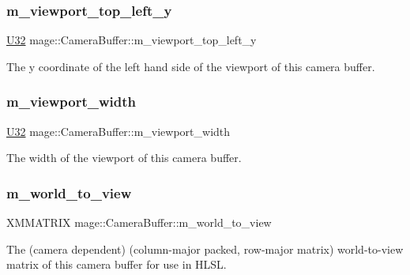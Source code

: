 \subsubsection{\texorpdfstring{m\+\_\+viewport\+\_\+top\+\_\+left\+\_\+y}{m\_viewport\_top\_left\_y}}
{\footnotesize\ttfamily \hyperlink{namespacemage_a41c104c036fba3756a74e19f793eeaa1}{U32} mage\+::\+Camera\+Buffer\+::m\+\_\+viewport\+\_\+top\+\_\+left\+\_\+y}

The y coordinate of the left hand side of the viewport of this camera buffer. \hypertarget{structmage_1_1_camera_buffer_a9aec8f6ee54281ae7ec410be846c3658}{}\label{structmage_1_1_camera_buffer_a9aec8f6ee54281ae7ec410be846c3658} 
\subsubsection{\texorpdfstring{m\+\_\+viewport\+\_\+width}{m\_viewport\_width}}
{\footnotesize\ttfamily \hyperlink{namespacemage_a41c104c036fba3756a74e19f793eeaa1}{U32} mage\+::\+Camera\+Buffer\+::m\+\_\+viewport\+\_\+width}

The width of the viewport of this camera buffer. \hypertarget{structmage_1_1_camera_buffer_a28db697d7da502479b3e29752122c9f4}{}\label{structmage_1_1_camera_buffer_a28db697d7da502479b3e29752122c9f4} 
\subsubsection{\texorpdfstring{m\+\_\+world\+\_\+to\+\_\+view}{m\_world\_to\_view}}
{\footnotesize\ttfamily X\+M\+M\+A\+T\+R\+IX mage\+::\+Camera\+Buffer\+::m\+\_\+world\+\_\+to\+\_\+view}

The (camera dependent) (column-\/major packed, row-\/major matrix) world-\/to-\/view matrix of this camera buffer for use in H\+L\+SL. 